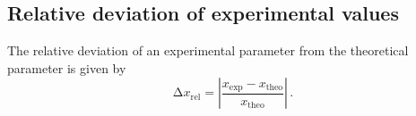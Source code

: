 \subsection{Relative deviation of experimental values}
\label{sec:fehlerrechnung}
The relative deviation of an experimental parameter from the theoretical parameter is given by~\cite{relabw}
\begin{equation}
    \increment x_{\mathrm{rel}} = \left| \frac{x_{\mathrm{\exp}}-x_{\mathrm{theo}}}{x_{\mathrm{theo}}}\right|\, .
    \label{eqn:relabw}
\end{equation}

